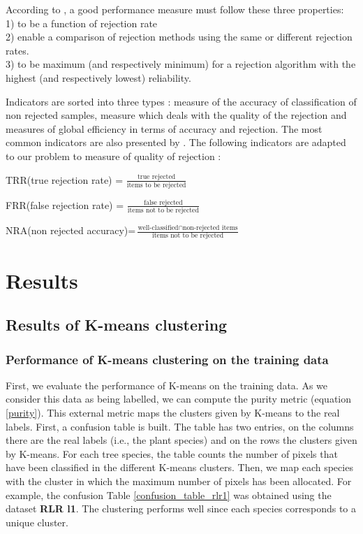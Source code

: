 \documentclass{siamart171218}
\begin{document}
According to \cite{condessa2017Performance}, a good performance measure must follow these three properties: \\
1) to be a function of rejection rate \\
2) enable a comparison of rejection methods using the same or different rejection rates.\\
3) to be maximum (and respectively minimum) for a rejection algorithm with the highest  (and respectively lowest) reliability. 

Indicators are sorted into three types \cite{condessa2017Performance}: measure of the accuracy of classification of non rejected samples, measure which deals with the quality of the rejection and measures of global efficiency in terms of accuracy and rejection. The most common indicators are also presented by \cite{guichard2010nouveau}. The following indicators are adapted to our problem to measure of quality of rejection :

TRR(true rejection rate) = $\frac{\text{true rejected}}{\text{items to be rejected}} $

FRR(false rejection rate) = $\frac{\text{false rejected}}{\text{items not to be rejected}}$

NRA(non rejected accuracy)=$\frac{\text{well-classified} \cap \text{non-rejected items}}{\text{items not to be rejected}}$

\section{Results} 

\subsection{Results of K-means clustering}
\label{Kmeans_part}

\subsubsection{Performance of K-means clustering on the training data}
First, we evaluate the performance of K-means on the training data. As we consider this data as being labelled, we can compute the purity metric (equation \ref{purity}). This external metric maps the clusters given by K-means to the real labels. First, a confusion table is built. The table has two entries, on the columns there are the real labels (i.e., the plant species) and on the rows the clusters given by K-means. For each tree species, the table counts the number of pixels that have been classified in the different K-means clusters. Then, we map each species with the cluster in which the maximum number of pixels has been allocated. For example, the confusion Table \ref{confusion_table_rlr1} was obtained using the dataset \textbf{RLR l1}. The clustering performs well since each species corresponds to a unique cluster.
\end{document}
